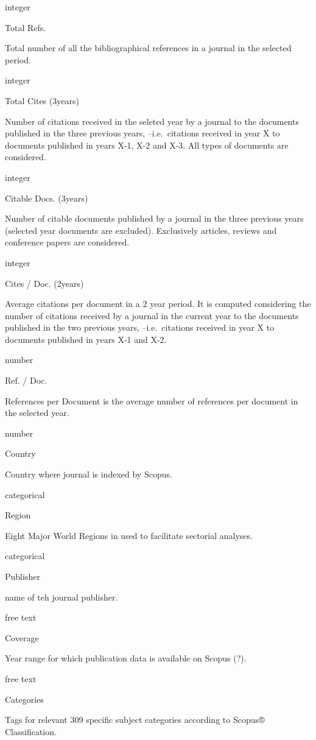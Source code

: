 \documentclass[
]{article}
\begin{document}
integer

Total Refs.

Total number of all the bibliographical references in a journal in the
selected period.

integer

Total Cites (3years)

Number of citations received in the seleted year by a journal to the
documents published in the three previous years, --i.e.~citations
received in year X to documents published in years X-1, X-2 and X-3. All
types of documents are considered.

integer

Citable Docs. (3years)

Number of citable documents published by a journal in the three previous
years (selected year documents are excluded). Exclusively articles,
reviews and conference papers are considered.

integer

Cites / Doc. (2years)

Average citations per document in a 2 year period. It is computed
considering the number of citations received by a journal in the current
year to the documents published in the two previous years,
--i.e.~citations received in year X to documents published in years X-1
and X-2.

number

Ref. / Doc.

References per Document is the average number of references per document
in the selected year.

number

Country

Country where journal is indexed by Scopus.

categorical

Region

Eight Major World Regions in used to facilitate sectorial analyses.

categorical

Publisher

name of teh journal publisher.

free text

Coverage

Year range for which publication data is available on Scopus (?).

free text

Categories

Tags for relevant 309 specific subject categories according to Scopus®
Classification.
\end{document}
